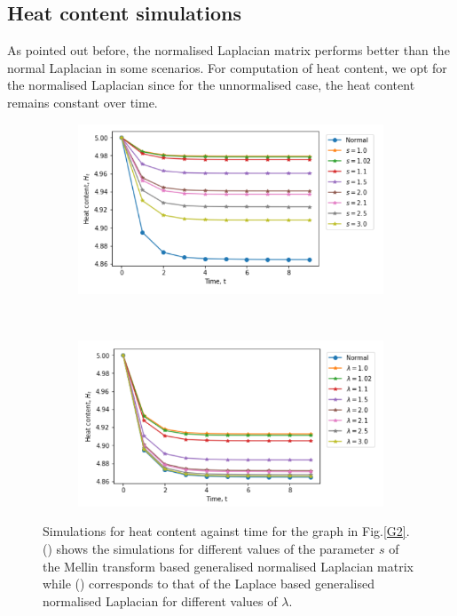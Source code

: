 \documentclass[10pt,a4paper]{article}
\theoremstyle{plain}
\theoremstyle{definition}
\begin{document}
  \subsection{Heat content simulations}
   As pointed out before, the normalised Laplacian matrix performs better than the normal Laplacian in some scenarios. For computation of heat content, we opt for the normalised Laplacian since for the unnormalised case, the heat content remains constant over time.
    \begin{figure}[H]
    	\centering
    	\begin{subfigure}[b]{0.5\textwidth}
    		\includegraphics[width= \textwidth]{images/Mellin-heatcontent.png}
    		\caption{}
    		\label{mellin-heatcont}
    	\end{subfigure}~
    	\begin{subfigure}[b]{0.5\textwidth}
    		\includegraphics[width= \textwidth]{images/Laplace-heatcontent.png}
    		\caption{ }
    		\label{laplace-heatcont}
    	\end{subfigure}
    	\caption{Simulations for heat content against time for the graph in Fig.\ref{G2}. () shows the simulations for different values of the parameter $s$ of the Mellin transform based generalised normalised Laplacian matrix while () corresponds to that of the Laplace based generalised normalised Laplacian for different values of $\lambda$. }
    	\label{}
    \end{figure}
\end{document}
